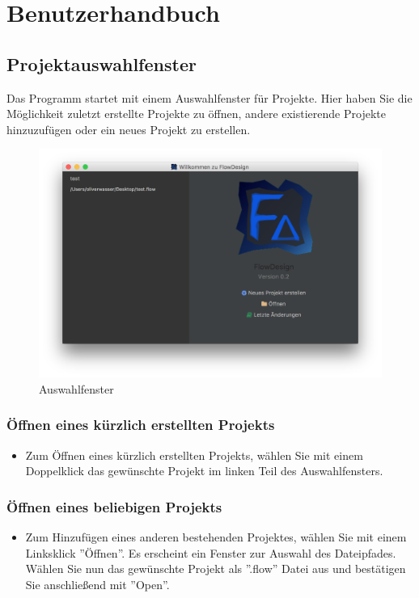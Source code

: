 
\section{Benutzerhandbuch}

\subsection{Projektauswahlfenster}
Das Programm startet mit einem Auswahlfenster für Projekte. Hier haben Sie die Möglichkeit zuletzt erstellte Projekte zu öffnen, andere existierende Projekte hinzuzufügen oder ein neues Projekt zu erstellen. 

\begin{figure}[h!]
	\centering
	\includegraphics[width=1.0\textwidth]{Auswahlfenster.png}
	\caption{Auswahlfenster}
\end{figure}


\subsubsection{Öffnen eines kürzlich erstellten Projekts}
\begin{itemize}
\item Zum Öffnen eines kürzlich erstellten Projekts, wählen Sie mit einem Doppelklick das gewünschte Projekt im linken Teil des Auswahlfensters. 
\end{itemize}
\subsubsection{Öffnen eines beliebigen Projekts}
\begin{itemize}
\item Zum Hinzufügen eines anderen bestehenden Projektes, wählen Sie mit einem Linksklick ''Öffnen''. Es erscheint ein Fenster zur Auswahl des Dateipfades. Wählen Sie nun das gewünschte Projekt als ''.flow'' Datei aus und bestätigen Sie anschließend mit ''Open''. 
\end{itemize}
